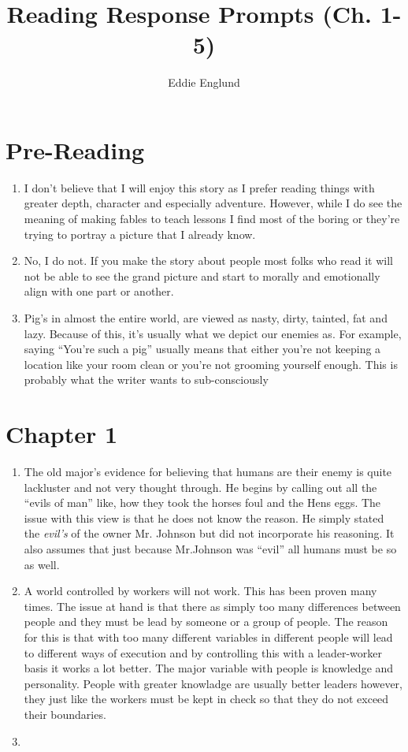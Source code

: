 \documentclass[12pt]{article}
\title{Reading Response Prompts (Ch. 1-5)}
\author{Eddie Englund}
\begin{document}
    
    \maketitle

    \section{Pre-Reading}

    \begin{enumerate}
        \item I don't believe that I will enjoy this story as I prefer reading things with greater depth, character and especially adventure. However, while I do see the meaning of making fables to teach lessons I find most of the boring or they're trying to portray a picture that I already know.
        \item No, I do not. If you make the story about people most folks who read it will not be able to see the grand picture and start to morally and emotionally align with one part or another.
        \item Pig's in almost the entire world, are viewed as nasty, dirty, tainted, fat and lazy. Because of this, it's usually what we depict our enemies as. For example, saying ``You're such a pig'' usually means that either you're not keeping a location like your room clean or you're not grooming yourself enough. This is probably what the writer wants to sub-consciously
    \end{enumerate}

    \section{Chapter 1}

    \begin{enumerate}
        \item The old major's evidence for believing that humans are their enemy is quite lackluster and not very thought through. He begins by calling out all the ``evils of man'' like, how they took the horses foul and the Hens eggs. The issue with this view is that he does not know the reason. He simply stated the \textit{evil's} of the owner Mr. Johnson but did not incorporate his reasoning. It also assumes that just because Mr.Johnson was ``evil'' all humans must be so as well.
        \item A world controlled by workers will not work. This has been proven many times. The issue at hand is that there as simply too many differences between people and they must be lead by someone or a group of people. The reason for this is that with too many different variables in different people will lead to different ways of execution and by controlling this with a leader-worker basis it works a lot better. The major variable with people is knowledge and personality. People with greater knowladge are usually better leaders however, they just like the workers must be kept in check so that they do not exceed their boundaries.
        \item 
    \end{enumerate}
\end{document}
